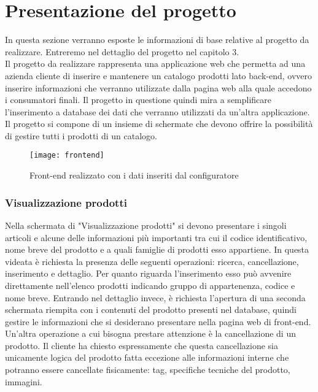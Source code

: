 \section{Presentazione del progetto}
In questa sezione verranno esposte le informazioni di base relative al progetto da realizzare. Entreremo nel dettaglio del progetto nel capitolo 3.
\\
Il progetto da realizzare rappresenta una applicazione web che permetta ad una azienda cliente di inserire e mantenere un catalogo prodotti lato back-end, ovvero inserire informazioni che verranno utilizzate dalla pagina web alla quale accedono i consumatori finali. 
Il progetto in questione quindi mira a semplificare l'inserimento a database dei dati che verranno utilizzati da un'altra applicazione.\\
Il progetto si compone di un insieme di schermate che devono offrire la possibilità di gestire tutti i prodotti di un catalogo. 


\begin{figure}[!h] 
	\centering 
	\texttt{[image: frontend]} 
	\caption{Front-end realizzato con i dati inseriti dal configuratore}
	\label{ImgFrontend}
\end{figure}

\subsubsection{Visualizzazione prodotti}
Nella schermata di "Visualizzazione prodotti" si devono presentare i singoli articoli e alcune delle informazioni più importanti tra cui il codice identificativo, nome breve del prodotto e a quali famiglie di prodotti esso appartiene. In questa videata è richiesta la presenza delle seguenti operazioni: ricerca, cancellazione, inserimento e dettaglio.
Per quanto riguarda l'inserimento esso può avvenire direttamente nell'elenco prodotti indicando gruppo di appartenenza, codice e nome breve.
Entrando nel dettaglio invece, è richiesta l'apertura di una seconda schermata riempita con i contenuti del prodotto presenti nel database, quindi gestire le informazioni che si desiderano presentare nella pagina web di front-end.
Un'altra operazione a cui bisogna prestare attenzione è la cancellazione di un prodotto. Il cliente ha chiesto espressamente che questa cancellazione sia unicamente logica del prodotto fatta eccezione alle informazioni interne che potranno essere cancellate fisicamente: tag, specifiche tecniche del prodotto, immagini.

